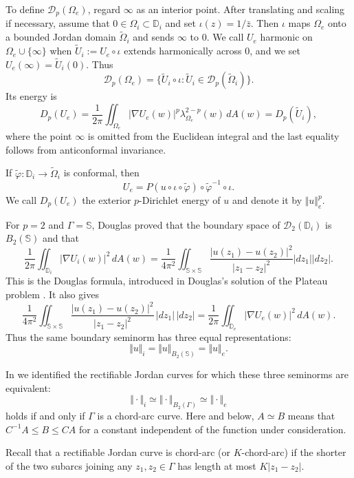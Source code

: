 \documentclass[11pt]{article}
\numberwithin{equation}{section}
\theoremstyle{remark}
\begin{document}
To define $\mathcal D_p(\Omega_e)$, regard $\infty$ as an interior
point.  After translating and scaling if necessary, assume that
$0\in\Omega_i \subset\mathbb D_i$ and set $\iota(z)=1/\bar z$.  Then $\iota$ maps $\Omega_e$
onto a bounded Jordan domain $\widetilde\Omega_i$ and sends $\infty$ to $0$.
We call $U_e$ harmonic on $\Omega_e\cup\{\infty\}$ when
$\widetilde U_i:=U_e\circ\iota$ extends harmonically across $0$, and we set
$U_e(\infty)=\widetilde U_i(0)$.  Thus
\[
\mathcal D_p(\Omega_e)=
\{\widetilde U_i\circ\iota:\widetilde U_i\in
\mathcal D_p(\widetilde\Omega_i)\}.
\]
Its energy is
\[
D_p(U_e)=\frac{1}{2\pi}\iint_{\Omega_e}
|\nabla U_e(w)|^p\lambda_{\Omega_e}^{2-p}(w)\,dA(w)
=D_p(\widetilde U_i),
\]
where the point $\infty$ is omitted from the Euclidean integral and the
last equality follows from anticonformal invariance.


If $\widetilde\varphi:\mathbb D_i\to\widetilde\Omega_i$ is
conformal, then
\[
U_e=P(u\circ\iota\circ\widetilde\varphi)
\circ\widetilde\varphi^{-1}\circ\iota.
\]
We call $D_p(U_e)$ the exterior $p$-Dirichlet energy of $u$ and denote
it by $\Vert u\Vert_e^p$.

For $p=2$ and $\Gamma=\mathbb S$, Douglas proved that the boundary
space of $\mathcal D_2(\mathbb D_i)$ is $B_2(\mathbb S)$ and that
\begin{equation*}
    \frac{1}{2\pi}\iint_{\mathbb D_i}|\nabla U_i(w)|^2\,dA(w)
    =   \frac{1}{4\pi^2} \iint_{\mathbb S\times \mathbb S}  \frac{|u(z_1) - u(z_2)|^2}{|z_1 - z_2|^2} |dz_1||dz_2|.
\end{equation*}
This is the Douglas formula, introduced in Douglas's solution of the
Plateau problem \cite{dou}.  It also gives
$$
\frac{1}{4\pi^2} \iint_{\mathbb S\times \mathbb S}
\frac{|u(z_1) - u(z_2)|^2}{|z_1 - z_2|^2}\,|dz_1|\,|dz_2|
=\frac{1}{2\pi}\iint_{\mathbb D_e}|\nabla U_e(w)|^2\,dA(w).
$$
Thus the same boundary seminorm has three equal representations:
$$
\Vert u \Vert_i = \Vert u \Vert_{B_2(\mathbb S)} = \Vert u \Vert_e.
$$

In \cite{WZ} we identified the rectifiable Jordan curves for which
these three seminorms are equivalent:
\[
\Vert \cdot\Vert_i\simeq\Vert \cdot\Vert_{B_2(\Gamma)}
\simeq\Vert \cdot\Vert_e
\]
holds if and only if $\Gamma$ is a chord-arc curve.  Here and below,
$A\simeq B$ means that $C^{-1}A\le B\le CA$ for a constant independent of
the function under consideration.

Recall that a rectifiable Jordan curve is chord-arc (or
$K$-chord-arc) if the shorter of the two subarcs joining any
$z_1,z_2\in\Gamma$ has length at most $K|z_1-z_2|$.
\end{document}
